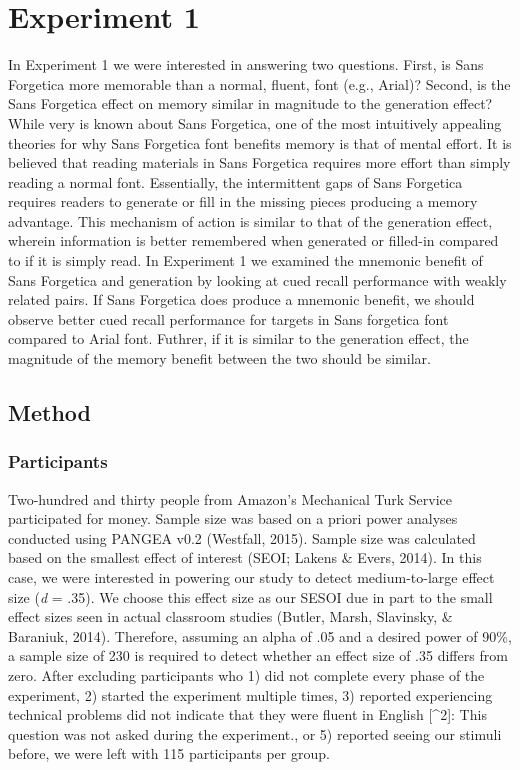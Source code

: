 \documentclass[english,pdf]{apa6}
\begin{document}
\hypertarget{experiment-1}{%
\section{Experiment 1}\label{experiment-1}}

In Experiment 1 we were interested in answering two questions. First, is Sans Forgetica more memorable than a normal, fluent, font (e.g., Arial)? Second, is the Sans Forgetica effect on memory similar in magnitude to the generation effect? While very is known about Sans Forgetica, one of the most intuitively appealing theories for why Sans Forgetica font benefits memory is that of mental effort. It is believed that reading materials in Sans Forgetica requires more effort than simply reading a normal font. Essentially, the intermittent gaps of Sans Forgetica requires readers to generate or fill in the missing pieces producing a memory advantage. This mechanism of action is similar to that of the generation effect, wherein information is better remembered when generated or filled-in compared to if it is simply read. In Experiment 1 we examined the mnemonic benefit of Sans Forgetica and generation by looking at cued recall performance with weakly related pairs. If Sans Forgetica does produce a mnemonic benefit, we should observe better cued recall performance for targets in Sans forgetica font compared to Arial font. Futhrer, if it is similar to the generation effect, the magnitude of the memory benefit between the two should be similar.

\hypertarget{method}{%
\subsection{Method}\label{method}}

\hypertarget{participants}{%
\subsubsection{Participants}\label{participants}}

Two-hundred and thirty people from Amazon's Mechanical Turk Service participated for money. Sample size was based on a priori power analyses conducted using PANGEA v0.2 (Westfall, 2015). Sample size was calculated based on the smallest effect of interest (SEOI; Lakens \& Evers, 2014). In this case, we were interested in powering our study to detect medium-to-large effect size (\emph{d} = .35). We choose this effect size as our SESOI due in part to the small effect sizes seen in actual classroom studies (Butler, Marsh, Slavinsky, \& Baraniuk, 2014). Therefore, assuming an alpha of .05 and a desired power of 90\%, a sample size of 230 is required to detect whether an effect size of .35 differs from zero. After excluding participants who 1) did not complete every phase of the experiment, 2) started the experiment multiple times, 3) reported experiencing technical problems did not indicate that they were fluent in English {[}\^{}2{]}: This question was not asked during the experiment., or 5) reported seeing our stimuli before, we were left with 115 participants per group.
\end{document}

